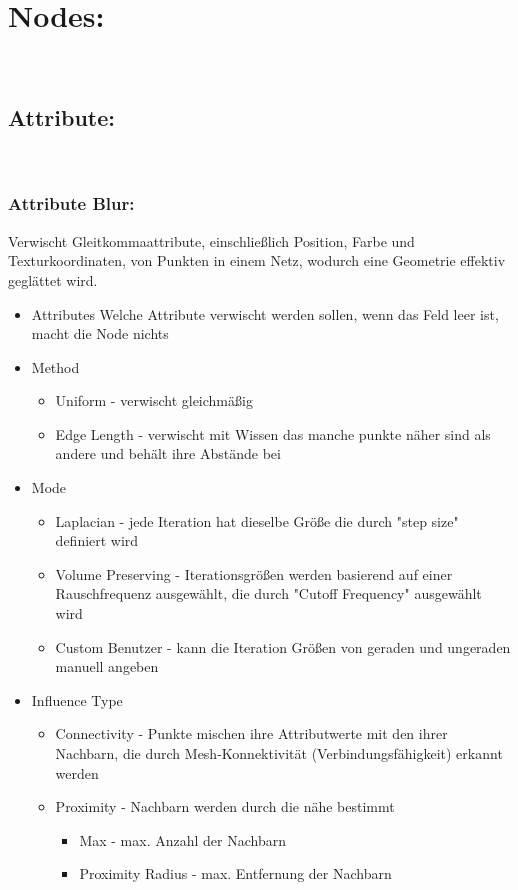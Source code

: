 

\pagestyle{plain}


\section*{​\textcolor{​rosa}​{​Nodes:}​}​
\subsection*{​Attribute:}​
\subsubsection*{​Attribute Blur:}
Verwischt Gleitkommaattribute, einschließlich Position, Farbe und Texturkoordinaten, von Punkten in einem Netz, wodurch eine Geometrie effektiv geglättet wird.
\begin{itemize}
\item Attributes	Welche Attribute verwischt werden sollen, wenn das Feld leer ist, macht die Node nichts
\item Method \begin{itemize} 
		\item Uniform - verwischt gleichmäßig
		\item Edge Length - verwischt mit Wissen das manche punkte näher sind als andere und behält ihre Abstände bei 
		\end{itemize}
\item Mode	\begin{itemize} 
		\item Laplacian - jede Iteration hat dieselbe Größe die durch "step size" definiert wird
		\item Volume Preserving - Iterationsgrößen werden basierend auf einer Rauschfrequenz ausgewählt, die durch "Cutoff Frequency" ausgewählt wird
		\item Custom	Benutzer - kann die Iteration Größen von geraden und ungeraden manuell angeben	
		\end{itemize}
\item Influence Type 
		\begin{itemize}
		\item Connectivity - Punkte mischen ihre Attributwerte mit den ihrer Nachbarn, die durch  Mesh-Konnektivität (Verbindungsfähigkeit) erkannt werden
		\item Proximity - Nachbarn werden durch die nähe bestimmt 
			\begin{itemize}
			\item Max - max. Anzahl der Nachbarn
			\item Proximity Radius - max. Entfernung der Nachbarn
			\end{itemize}
		\end{itemize}
\end{itemize}


